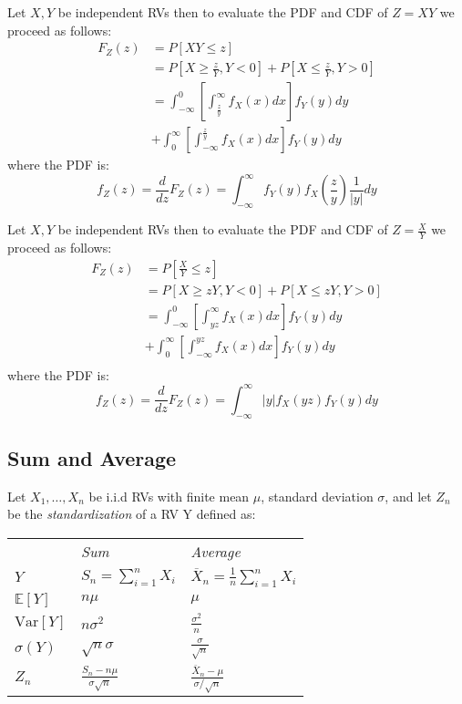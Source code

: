 \documentclass[8pt,a4paper]{extarticle}     %
\newcommand{\colnull}{\vfill\null\columnbreak}
\newcommand{\Var}{\mathrm{Var}}
\begin{document}
\begin{multicols}{4}
\begin{boxguide}[Product] 
	Let $X,Y$ be independent RVs then to evaluate the PDF and CDF of $Z=XY$ we proceed as follows: 
	\[
		\begin{split}
			F_Z(z)&=P\left[XY\leq z\right] \\
			&= \textstyle P\left[X\geq \frac{z}{Y}, Y<0\right] + P\left[X\leq \frac{z}{Y}, Y>0\right] \\
			&=\int_{-\infty}^{0}\left[\int_{\frac{z}{y}}^{\infty} f_X(x)dx\right] f_Y(y)dy\\ 
			&+\int_{0}^{\infty}\left[\int_{-\infty}^{\frac{z}{y}} f_X(x)dx\right] f_Y(y)dy 
		\end{split}
	\]
	where the PDF is:
	\[
		f_Z(z)=\frac{d}{dz}F_Z(z)=\int_{-\infty}^{\infty}f_Y(y)f_X\left(\frac{z}{y}\right)\frac{1}{\left\lvert y\right\rvert}dy
	\]
\end{boxguide}
\begin{boxguide}[Quotient] 
	Let $X,Y$ be independent RVs then to evaluate the PDF and CDF of $Z=\frac{X}{Y}$ we proceed as follows: 
	\[
		\begin{split}
			F_Z(z)&=P\left[\frac{X}{Y}\leq z\right] \\
			&= P\left[X\geq zY, Y<0\right] + P\left[X\leq zY, Y>0\right] \\
			&= \int_{-\infty}^{0}\left[\int_{yz}^{\infty}f_X(x)dx\right]f_Y(y)dy \\ &+ \int_{0}^{\infty}\left[\int_{-\infty}^{yz}f_X(x)dx\right]f_Y(y)dy \\
		\end{split}
	\]
	where the PDF is: 
	\[
		f_Z(z)=\frac{d}{dz}F_Z(z)=\int_{-\infty}^{\infty}\left\lvert y\right\rvert f_X(yz)f_Y(y)dy 
	\]
\end{boxguide}
\colnull 
\subsection{Sum and Average}
Let $X_1,\dots,X_n$ be i.i.d RVs with finite mean $\mu$, standard deviation $\sigma$, and let $Z_n$ be the \textit{standardization} of a RV Y defined as:
\\[1em]
{\renewcommand{\arraystretch}{1.2}
\begin{tabularx}{\hsize}{s|t|t}
	\hline
	\rule{0pt}{1.3em}
	 & \textit{Sum} & \textit{Average} \\[0.3em]
	$Y$ & $\displaystyle S_n=\sum_{i=1}^{n}X_i$ & $\displaystyle\overline{X}_n=\frac{1}{n}\sum_{i=1}^{n}X_i$\\[1.5em]
	\hline
	\rule{0pt}{1.5em}
	$\mathbb{E}[Y]$ & $n\mu$ & $\mu$\\[0.5em]
	$\Var\left[Y\right]$ & $n\sigma^2$ & $\displaystyle\frac{\sigma^2}{n}$\\[1em]
	$\sigma(Y)$ & $\displaystyle\sqrt{n}\sigma$ & $\displaystyle\frac{\sigma}{\sqrt{n}}$\\[1em]
	$Z_n$	& $\displaystyle\frac{S_n-n\mu}{\sigma\sqrt{n}}$ & $\displaystyle\frac{\overline{X}_n-\mu}{\sigma/\sqrt{n}}$\\[1em]  
	\hline
\end{tabularx}} 
\noindent

\end{multicols}
\end{document}

